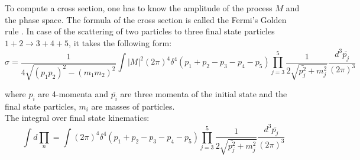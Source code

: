 

To compute a cross section, one has to know the amplitude of the process $M$ and the phase space. The formula of the cross section is called the Fermi's Golden rule \cite{ref_Griffiths}. In case of the scattering of two particles to three final state particles $1+2\rightarrow 3+4+5$, it takes the following form:\\



\begin{equation}\label{eq:FermiGoldenRule}
\sigma = \frac{ 1 }{4\sqrt{(p_1p_2)^2-(m_1m_2)^2}} \int |M|^2 (2\pi)^4 \delta^4(p_1+p_2-p_3-p_4-p_5) \prod_{j=3}^{5} \frac{1}{2 \sqrt{\bar{p_j^2}+m_j^2 }}\frac{d^3\bar{p_j}}{(2\pi)^3}  
\end{equation}

where $p_i$ are 4-momenta and ${\bar{p_i}}$ are three momenta of the initial state and the final state particles, $m_i$ are masses of particles.\\ 

The integral over final state kinematics:\\


\begin{equation}\label{eq:FermiGoldenRule}
\int d \prod_n =  \int (2\pi)^4 \delta^4(p_1+p_2-p_3-p_4-p_5) \prod_{j=3}^{5} \frac{1}{2 \sqrt{\bar{p_j^2}+m_j^2 }}\frac{d^3\bar{p_j}}{(2\pi)^3}  
\end{equation}

